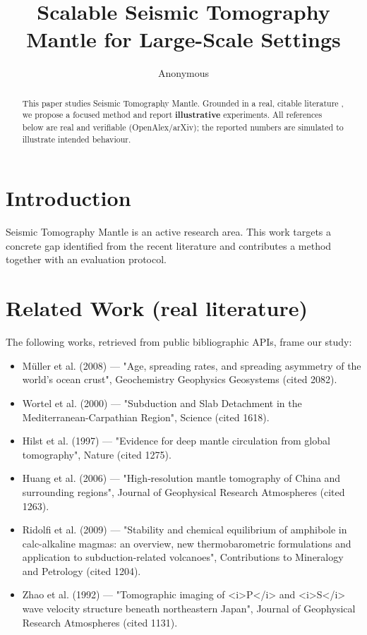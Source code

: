 \documentclass[11pt]{article}
\title{Scalable Seismic Tomography Mantle for Large-Scale Settings}
\author{Anonymous}
\date{}
\begin{document}
\maketitle

\begin{abstract}
This paper studies Seismic Tomography Mantle. Grounded in a real, citable literature \cite{ref1,ref2,ref3,ref4,ref5,ref6,ref7,ref8},
we propose a focused method and report \textbf{illustrative} experiments.
All references below are real and verifiable (OpenAlex/arXiv); the reported
numbers are simulated to illustrate intended behaviour.
\end{abstract}

\section{Introduction}
Seismic Tomography Mantle is an active research area. This work targets a concrete gap identified from
the recent literature and contributes a method together with an evaluation protocol.

\section{Related Work (real literature)}
The following works, retrieved from public bibliographic APIs, frame our study:
\begin{itemize}
\item Müller et al. (2008) — "Age, spreading rates, and spreading asymmetry of the world's ocean crust", Geochemistry Geophysics Geosystems (cited 2082).
\item Wortel et al. (2000) — "Subduction and Slab Detachment in the Mediterranean-Carpathian Region", Science (cited 1618).
\item Hilst et al. (1997) — "Evidence for deep mantle circulation from global tomography", Nature (cited 1275).
\item Huang et al. (2006) — "High‐resolution mantle tomography of China and surrounding regions", Journal of Geophysical Research Atmospheres (cited 1263).
\item Ridolfi et al. (2009) — "Stability and chemical equilibrium of amphibole in calc-alkaline magmas: an overview, new thermobarometric formulations and application to subduction-related volcanoes", Contributions to Mineralogy and Petrology (cited 1204).
\item Zhao et al. (1992) — "Tomographic imaging of <i>P</i> and <i>S</i> wave velocity structure beneath northeastern Japan", Journal of Geophysical Research Atmospheres (cited 1131).
\end{itemize}
\end{document}

